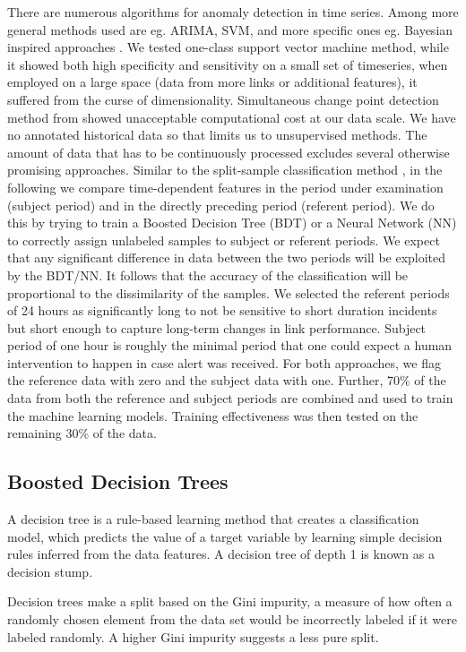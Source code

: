 \documentclass[5p]{elsarticle}
\begin{document}
There are numerous algorithms for anomaly detection in time series. Among more general methods used are eg. ARIMA, SVM, and more specific ones eg. Bayesian inspired approaches \cite{sedam}. We tested one-class support vector machine method, while it showed both high specificity and sensitivity on a small set of timeseries, when employed on a large space (data from more links or additional features), it suffered from the curse of dimensionality. Simultaneous change point detection method from \cite{sedam} showed unacceptable computational cost at our data scale. We have no annotated historical data so that limits us to unsupervised methods. The amount of data that has to be continuously processed excludes several otherwise promising approaches. Similar to the split-sample classification method \cite{sest}, in the following we compare time-dependent features in the period under examination (subject period) and in the directly preceding period (referent period). We do this by trying to train a Boosted Decision Tree (BDT)\cite{osam} or a Neural Network (NN) to correctly assign unlabeled samples to subject or referent periods.  We expect that any significant difference in data between the two periods will be exploited by the BDT/NN. It follows that the accuracy of the classification will be proportional to the dissimilarity of the samples. We selected the referent periods of 24 hours as significantly long to not be sensitive to short duration incidents but short enough to capture long-term changes in link performance. Subject period of one hour is roughly the minimal period that one could expect a human intervention to happen in case alert was received. For both approaches, we flag the reference data with zero and the subject data with one.  Further, 70\% of the data from both the reference and subject periods are combined and used to train the machine learning models. Training effectiveness was then tested on the remaining 30\% of the data.

\subsection{Boosted Decision Trees}

A decision tree is a rule-based learning method \cite{dva} that creates a classification model, which predicts the value of a target variable by learning simple decision rules inferred from the data features. A decision tree of depth 1 is known as a decision stump.

Decision trees make a split based on the Gini impurity, a measure of how often a randomly chosen element from the data set would be incorrectly labeled if it were labeled randomly. A higher Gini impurity suggests a less pure split.
\end{document}
